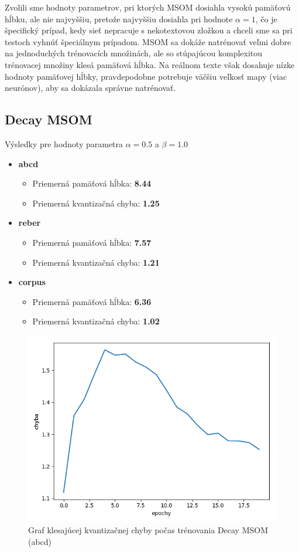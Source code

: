 Zvolili sme hodnoty parametrov, pri ktorých MSOM dosiahla vysokú pamäťovú hĺbku, ale nie najvyššiu, pretože 
najvyššiu dosiahla pri hodnote $\alpha = 1$, čo je špecifický prípad, kedy sieť nepracuje s nekotextovou zložkou a chceli 
sme sa pri testoch vyhnúť špeciálnym prípadom.
MSOM sa dokáže natrénovať veľmi dobre na jednoduchých trénovacích množinách, ale so stúpajúcou komplexitou trénovacej 
množiny klesá pamäťová hĺbka.
Na reálnom texte však dosahuje nízke hodnoty pamäťovej hĺbky, pravdepodobne 
potrebuje väčšiu veľkosť mapy (viac neurónov), aby sa dokázala správne natrénovať.


\subsection{Decay MSOM}
Výsledky pre hodnoty parametra $\alpha = 0.5$ a $\beta = 1.0$
\begin{itemize}
    \item \textbf{abcd}
    \begin{itemize}
        \item Priemerná pamäťová hĺbka: \textbf{8.44}
        \item Priemerná kvantizačná chyba: \textbf{1.25}
    \end{itemize}
    \item \textbf{reber}
    \begin{itemize}
        \item Priemerná pamäťová hĺbka: \textbf{7.57}
        \item Priemerná kvantizačná chyba: \textbf{1.21}    
    \end{itemize}
    \item \textbf{corpus}
    \begin{itemize}
        \item Priemerná pamäťová hĺbka: \textbf{6.36}
        \item Priemerná kvantizačná chyba: \textbf{1.02}
    \end{itemize}
\end{itemize}

\begin{figure}[H]
    \centering
    \includegraphics[width=\textwidth]{assets/dm_error_top}
    \caption{Graf klesajúcej kvantizačnej chyby počas trénovania Decay MSOM (abcd)}
\end{figure}

